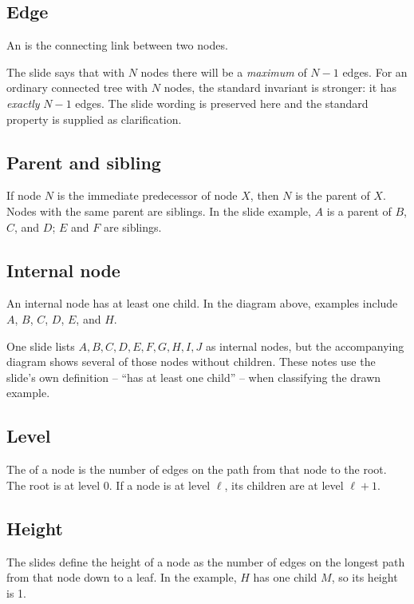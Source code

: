 \subsection{Edge}
An  is the connecting link between two nodes.

\begin{clarification}
The slide says that with $N$ nodes there will be a \emph{maximum} of $N-1$ edges. For an ordinary connected tree with $N$ nodes, the standard invariant is stronger: it has \emph{exactly} $N-1$ edges. The slide wording is preserved here and the standard property is supplied as clarification.
\end{clarification}

\subsection{Parent and sibling}
If node $N$ is the immediate predecessor of node $X$, then $N$ is the parent of $X$. Nodes with the same parent are siblings. In the slide example, $A$ is a parent of $B$, $C$, and $D$; $E$ and $F$ are siblings.

\subsection{Internal node}
An internal node has at least one child. In the diagram above, examples include $A$, $B$, $C$, $D$, $E$, and $H$.

\begin{clarification}
One slide lists $A,B,C,D,E,F,G,H,I,J$ as internal nodes, but the accompanying diagram shows several of those nodes without children. These notes use the slide's own definition -- ``has at least one child'' -- when classifying the drawn example.
\end{clarification}

\subsection{Level}
The  of a node is the number of edges on the path from that node to the root. The root is at level 0. If a node is at level $\ell$, its children are at level $\ell+1$.

\subsection{Height}
The slides define the height of a node as the number of edges on the longest path from that node down to a leaf. In the example, $H$ has one child $M$, so its height is 1.

